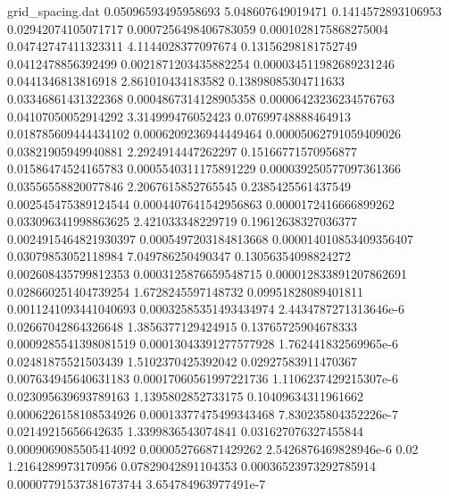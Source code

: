 \begin{filecontents}{grid_spacing.dat}
0.05096593495958693 	5.048607649019471 	0.1414572893106953  	0.02942074105071717   	0.0007256498406783059 	0.0001028175868275004  
0.04742747411323311 	4.1144028377097674	0.13156298181752749 	0.0412478856392499    	0.0021871203435882254 	0.000034511982689231246
0.0441346813816918  	2.861010434183582 	0.13898085304711633 	0.03346861431322368   	0.0004867314128905358 	0.00006423236234576763 
0.04107050052914292 	3.314999476052423 	0.07699748888464913 	0.018785609444434102  	0.0006209236944449464 	0.00005062791059409026 
0.03821905949940881 	2.2924914447262297	0.15166771570956877 	0.01586474524165783   	0.0005540311175891229 	0.000039250577097361366
0.03556558820077846 	2.2067615852765545	0.2385425561437549  	0.002545475389124544  	0.0004407641542956863 	0.0000172416666899262  
0.033096341998863625	2.421033348229719 	0.19612638327036377 	0.0024915464821930397 	0.0005497203184813668 	0.000014010853409356407
0.03079853052118984 	7.049786250490347 	0.13056354098824272 	0.002608435799812353  	0.0003125876659548715 	0.000012833891207862691
0.028660251404739254	1.6728245597148732	0.09951828089401811 	0.0011241093441040693 	0.00032585351493434974	2.4434787271313646e-6  
0.02667042864326648 	1.3856377129424915	0.13765725904678333 	0.0009285541398081519 	0.00013043391277577928	1.762441832569965e-6   
0.02481875521503439 	1.5102370425392042	0.02927583911470367 	0.007634945640631183  	0.00017060561997221736	1.1106237429215307e-6  
0.023095639693789163	1.1395802852733175	0.10409634311961662 	0.0006226158108534926 	0.00013377475499343468	7.830235804352226e-7   
0.02149215656642635 	1.3399836543074841	0.031627076327455844	0.0009069085505414092 	0.000052766871429262  	2.5426876469828946e-6  
0.02                	1.2164289973170956	0.07829042891104353 	0.00036523973292785914	0.00007791537381673744	3.654784963977491e-7   
\end{filecontents}

